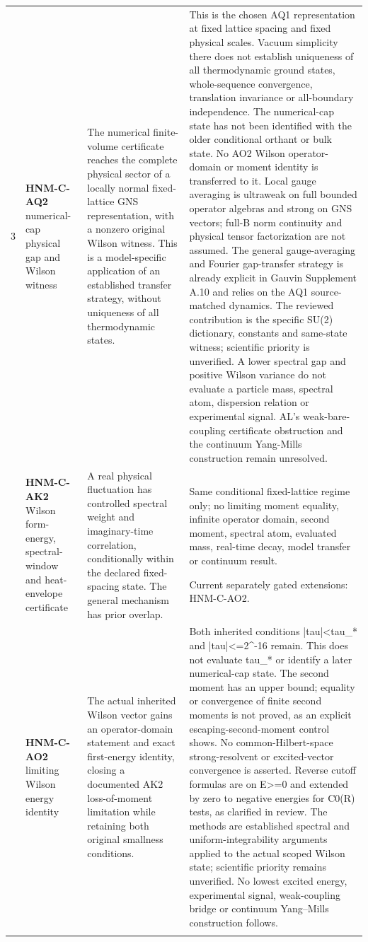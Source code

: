 \begin{longtable}{@{}p{8mm}p{44mm}p{53mm}p{43mm}@{}}
3 & \textbf{HNM-C-AQ2} numerical-cap physical gap and Wilson witness & The numerical finite-volume certificate reaches the complete physical sector of a locally normal fixed-lattice GNS representation, with a nonzero original Wilson witness. This is a model-specific application of an established transfer strategy, without uniqueness of all thermodynamic states. & This is the chosen AQ1 representation at fixed lattice spacing and fixed physical scales. Vacuum simplicity there does not establish uniqueness of all thermodynamic ground states, whole-sequence convergence, translation invariance or all-boundary independence. The numerical-cap state has not been identified with the older conditional orthant or bulk state. No AO2 Wilson operator-domain or moment identity is transferred to it. Local gauge averaging is ultraweak on full bounded operator algebras and strong on GNS vectors; full-B norm continuity and physical tensor factorization are not assumed. The general gauge-averaging and Fourier gap-transfer strategy is already explicit in Gauvin Supplement A.10 and relies on the AQ1 source-matched dynamics. The reviewed contribution is the specific SU(2) dictionary, constants and same-state witness; scientific priority is unverified. A lower spectral gap and positive Wilson variance do not evaluate a particle mass, spectral atom, dispersion relation or experimental signal. AL's weak-bare-coupling certificate obstruction and the continuum Yang-Mills construction remain unresolved.\\\addlinespace
4 & \textbf{HNM-C-AK2} Wilson form-energy, spectral-window and heat-envelope certificate & A real physical fluctuation has controlled spectral weight and imaginary-time correlation, conditionally within the declared fixed-spacing state. The general mechanism has prior overlap. & Same conditional fixed-lattice regime only; no limiting moment equality, infinite operator domain, second moment, spectral atom, evaluated mass, real-time decay, model transfer or continuum result.\par Current separately gated extensions: HNM-C-AO2.\\\addlinespace
5 & \textbf{HNM-C-AO2} limiting Wilson energy identity & The actual inherited Wilson vector gains an operator-domain statement and exact first-energy identity, closing a documented AK2 loss-of-moment limitation while retaining both original smallness conditions. & Both inherited conditions |tau|<tau\_* and |tau|<=2\textasciicircum{}-16 remain. This does not evaluate tau\_* or identify a later numerical-cap state. The second moment has an upper bound; equality or convergence of finite second moments is not proved, as an explicit escaping-second-moment control shows. No common-Hilbert-space strong-resolvent or excited-vector convergence is asserted. Reverse cutoff formulas are on E>=0 and extended by zero to negative energies for C0(R) tests, as clarified in review. The methods are established spectral and uniform-integrability arguments applied to the actual scoped Wilson state; scientific priority remains unverified. No lowest excited energy, experimental signal, weak-coupling bridge or continuum Yang--Mills construction follows.\\\addlinespace

\end{longtable}
